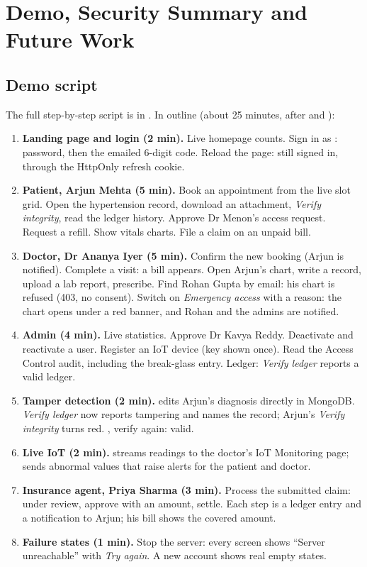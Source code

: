 \chapter{Demo, Security Summary and Future Work}\label{ch:demo}

\section{Demo script}

The full step-by-step script is in . In outline (about 25
minutes, after  and ):

\begin{enumerate}
  \item \textbf{Landing page and login (2 min).} Live homepage counts. Sign in as
    : password, then the emailed 6-digit code.
    Reload the page: still signed in, through the HttpOnly refresh cookie.
  \item \textbf{Patient, Arjun Mehta (5 min).} Book an appointment from the live
    slot grid. Open the hypertension record, download an attachment,
    \emph{Verify integrity}, read the ledger history. Approve Dr Menon's access
    request. Request a refill. Show vitals charts. File a claim on an unpaid bill.
  \item \textbf{Doctor, Dr Ananya Iyer (5 min).} Confirm the new booking (Arjun is
    notified). Complete a visit: a bill appears. Open Arjun's chart, write a
    record, upload a lab report, prescribe. Find Rohan Gupta by email: his chart
    is refused (403, no consent). Switch on \emph{Emergency access} with a
    reason: the chart opens under a red banner, and Rohan and the admins are
    notified.
  \item \textbf{Admin (4 min).} Live statistics. Approve Dr Kavya Reddy. Deactivate
    and reactivate a user. Register an IoT device (key shown once). Read the
    Access Control audit, including the break-glass entry. Ledger:
    \emph{Verify ledger} reports a valid ledger.
  \item \textbf{Tamper detection (2 min).}  edits Arjun's
    diagnosis directly in MongoDB. \emph{Verify ledger} now reports
    tampering and names the record; Arjun's \emph{Verify integrity} turns red.
    , verify again: valid.
  \item \textbf{Live IoT (2 min).}  streams
    readings to the doctor's IoT Monitoring page;  sends abnormal
    values that raise alerts for the patient and doctor.
  \item \textbf{Insurance agent, Priya Sharma (3 min).} Process the submitted
    claim: under review, approve with an amount, settle. Each step is a ledger
    entry and a notification to Arjun; his bill shows the covered amount.
  \item \textbf{Failure states (1 min).} Stop the server: every screen shows
    ``Server unreachable'' with \emph{Try again}. A new account shows real empty
    states.
\end{enumerate}

